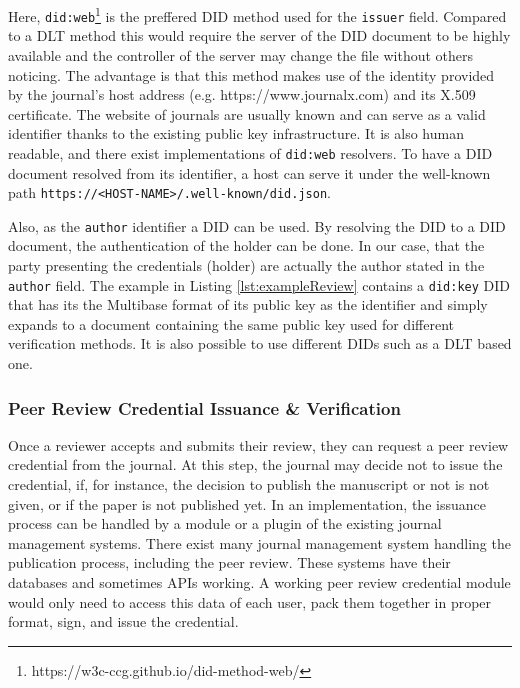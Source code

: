 Here, \lstinline{did:web}\footnote{https://w3c-ccg.github.io/did-method-web/} is the preffered \acrshort{DID} method used for the \lstinline{issuer} field. Compared to a \acrshort{DLT} method this would require the server of the \acrshort{DID} document to be highly available and the controller of the server may change the file without others noticing. The advantage is that this method makes use of the identity provided by the journal's host address (e.g. https://www.journalx.com) and its X.509 certificate. The website of journals are usually known and can serve as a valid identifier thanks to the existing public key infrastructure. It is also human readable, and there exist implementations of \lstinline{did:web} resolvers. To have a \acrshort{DID} document resolved from its identifier, a host can serve it under the well-known path \parencite{rfc5785} \lstinline{https://<HOST-NAME>/.well-known/did.json}. 

Also, as the \lstinline{author} identifier a \acrshort{DID} can be used. By resolving the \acrshort{DID} to a \acrshort{DID} document, the authentication of the holder can be done. In our case, that the party presenting the credentials (holder) are actually the author stated in the \lstinline{author} field. The example in Listing \ref{lst:exampleReview} contains a \lstinline{did:key} \parencite{did-key} \acrshort{DID} that has its the Multibase format \parencite{multiformats-multibase-03} of its public key as the identifier and simply expands to a document containing the same public key used for different verification methods. It is also possible to use different \acrshort{DID}s such as a \acrshort{DLT} based one.



\subsubsection{Peer Review Credential Issuance \& Verification}

Once a reviewer accepts and submits their review, they can request a peer review credential from the journal. At this step, the journal may decide not to issue the credential, if, for instance, the decision to publish the manuscript or not is not given, or if the paper is not published yet. In an implementation, the issuance process can be handled by a module or a plugin of the existing journal management systems. There exist many journal management system handling the publication process, including the peer review. These systems have their databases and sometimes \acrshort{API}s working. A working peer review credential module would only need to access this data of each user, pack them together in proper format, sign, and issue the credential. 

